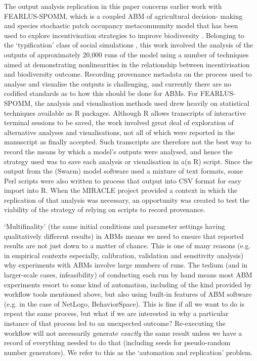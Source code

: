 \documentclass[runningheads]{llncs}
\begin{document}
The output analysis replication in this paper concerns earlier work with
FEARLUS-SPOMM, which is a coupled ABM of agricultural decision-
making and species stochastic patch occupancy metacommunity model that has been
used to explore incentivisation strategies to improve biodiversity
\cite{polhill_nonlinearities_2013,gimona2011exploring}. Belonging to the
‘typification’ class of social simulations  \cite{boero2005does}, this work
involved the analysis of the outputs of approximately 20,000 runs of the model
using a number of techniques aimed at demonstrating nonlinearities in the
relationship between incentivisation and biodiversity outcome.  Recording
provenance metadata on the process used to analyse and visualise the outputs is challenging, and
currently there are no codified standards as to how this should be done for
ABMs. For FEARLUS-SPOMM, the analysis and visualisation methods used drew heavily on statistical
techniques available as R packages.
Although R allows transcripts of interactive terminal sessions to be saved, the
work involved great deal of exploration of alternative analyses and visualisations, not all of
which were reported in the manuscript as finally accepted. Such transcripts are therefore not the
best way to record the means by which a model's outputs were analysed, and hence the
strategy used was to save each analysis or visualisation in a(n R) script.
Since the output from the (Swarm) model software used a mixture of text formats, some Perl scripts were also written to
process that output into CSV format for easy import into R. When the MIRACLE
project \cite{parker2019final} provided a context in which the replication of
that analysis was necessary, an opportunity was created to test the viability
of the strategy of relying on scripts to record provenance.

`Multifinality' (the same initial conditions and parameter settings having qualitatively different results) in ABMs means we need to ensure that
reported results are not just down to a matter of chance. This is one of many reasons (e.g. in empirical contexts especially, calibration, validation and sensitivity analysis) why experiments with ABMs involve large numbers of runs. The tedium (and in larger-scale cases, infeasibility) of conducting each run by hand means most ABM experiments resort to some kind of automation, including of the kind provided by workflow tools mentioned above, but also using built-in features of ABM software (e.g. in the case of NetLogo, BehaviorSpace). This is fine if all we
want to do is repeat the same process, but what if we are interested in why a particular instance of that process led to an unexpected outcome? Re-executing the workflow will not necessarily generate \textit{exactly} the same result unless we have a record of everything needed to do that (including seeds for pseudo-random number generators). We refer to this
as the `automation and replication' problem.  
\end{document}
